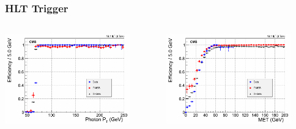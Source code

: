 \documentclass{beamer}
\begin{document}
 \begin{frame}
 \frametitle{HLT Trigger}
  \begin{minipage}[t]{0.83\paperwidth}
   \begin{tcolorbox}[colback=UNL@Cream!5,colframe=UNL@Cream!70,title=\textcolor{UMN@Maroon}{\textbf{HLT\_DisplacedPhoton65\_CaloIdVL\_IsoL\_PFMET25}}] 
 \begin{columns}
    \begin{column}{0.55\linewidth}
    \includegraphics[height=0.45\textwidth,width=0.85\textwidth]{THESISPLOTS/Photon_EffAsym.png}
    \end{column}
    \begin{column}{0.55\linewidth}
     \includegraphics[height=0.45\textwidth,width=0.85\textwidth]{THESISPLOTS/PFMET_EffAsym.png} 
    \end{column}

\end{columns}
\end{tcolorbox}
\end{minipage}
\end{frame}
\end{document}
